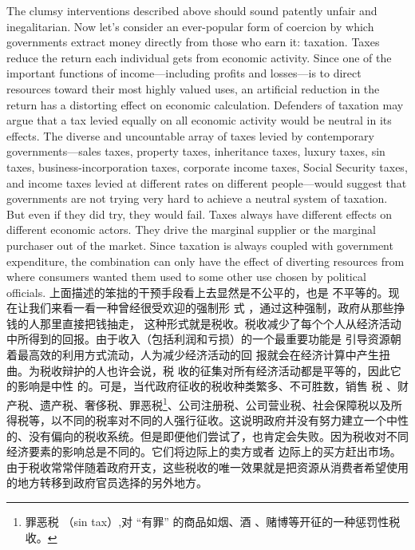 \begin{paracol}{2}
The clumsy interventions described above should sound
patently unfair and inegalitarian. Now let's consider an ever-popular form of coercion by which governments extract money
directly from those who earn it: taxation. Taxes reduce the return each individual gets from economic activity. Since one of
the important functions of income---including profits and
losses---is to direct resources toward their most highly valued
uses, an artificial reduction in the return has a distorting effect
on economic calculation. Defenders of taxation may argue that
a tax levied equally on all economic activity would be neutral in
its effects. The diverse and uncountable array of taxes levied by
contemporary governments---sales taxes, property taxes, inheritance taxes, luxury taxes, sin taxes, business-incorporation
taxes, corporate income taxes, Social Security taxes, and income
taxes levied at different rates on different people---would suggest that governments are not trying very hard to achieve a
neutral system of taxation. But even if they did try, they would
fail. Taxes always have different effects on different economic
actors. They drive the marginal supplier or the marginal purchaser out of the market. Since taxation is always coupled with
government expenditure, the combination can only have the effect of diverting resources from where consumers wanted them
used to some other use chosen by political officials.
\switchcolumn
上面描述的笨拙的干预手段看上去显然是不公平的，也是
不平等的。现在让我们来看一看一种曾经很受欢迎的强制形
式 ，通过这种强制，政府从那些挣钱的人那里直接把钱抽走，
这种形式就是税收。税收减少了每个个人从经济活动中所得到的回报。由于收入（包括利润和亏损）的一个最重要功能是
引导资源朝着最高效的利用方式流动，人为减少经济活动的回
报就会在经济计算中产生扭曲。为税收辩护的人也许会说，税
收的征集对所有经济活动都是平等的，因此它的影响是中性
的。可是，当代政府征收的税收种类繁多、不可胜数，销售
税 、财产税、遗产税、奢侈税、罪恶税\footnote{罪恶税 （sin tax）,对 “有罪” 的商品如烟、酒 、赌博等开征的一种惩罚性税收。}、公司注册税、公司营业税、社会保障税以及所得税等，以不同的税率对不同的人强行征收。这说明政府并没有努力建立一个中性的、没有偏向的税收系统。但是即便他们尝试了，也肯定会失败。因为税收对不同经济要素的影响总是不同的。它们将边际上的卖方或者
边际上的买方赶出市场。由于税收常常伴随着政府开支，这些税收的唯一效果就是把资源从消费者希望使用的地方转移到政府官员选择的另外地方。

\end{paracol}
